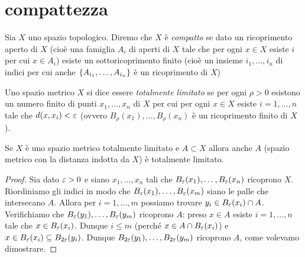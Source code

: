 \section{compattezza}



\begin{definition}[compattezza]
Sia $X$ uno spazio topologico. 
Diremo che $X$ è \emph{compatto} se dato un ricoprimento 
aperto di $X$ (cioè una famiglia $A_i$ di aperti di $X$ tale
che per ogni $x\in X$ esiste $i$ per cui $x\in A_i$)
esiste un sottoricoprimento finito 
(cioè un insieme $i_1,\dots,i_n$
di indici per cui anche ${\left\{ A_{i_1}, \dots, A_{i_n} \right\}}$ 
è un ricoprimento di $X$)
\end{definition}

\begin{definition}
Uno spazio metrico $X$ si dice essere \emph{totalmente limitato}
se per ogni $\rho>0$ esistono un numero finito di punti 
$x_1, \dots, x_n$ di $X$ per cui per ogni $x\in X$ 
esiste $i=1,\dots,n$ tale che $d(x,x_i)<\varepsilon$
(ovvero $B_\rho(x_1), \dots, B_\rho(x_n)$ 
è un ricoprimento finito di $X$).
\end{definition}

\begin{lemma}
Se $X$ è uno spazio metrico totalmente limitato e $A\subset X$ allora 
anche $A$ (spazio metrico con la distanza indotta da $X$) 
è totalmente limitato.
\end{lemma}
\begin{proof}
Sia dato $\varepsilon>0$ e siano $x_1, \dots, x_n$ tali che 
$B_\varepsilon(x_1), \dots, B_\varepsilon(x_n)$ ricoprono $X$.
Riordiniamo gli indici in modo che $B_\varepsilon(x_1), \dots, B_\varepsilon(x_m)$
siano le palle che intersecano $A$.
Allora per $i=1,\dots,m$ possiamo trovare $y_i\in B_\varepsilon(x_i)\cap A$.
Verifichiamo che $B_\varepsilon(y_1), \dots, B_\varepsilon(y_m)$ ricoprono $A$:
preso $x\in A$ esiste $i=1,\dots,n$ tale che $x\in B_\varepsilon(x_i)$.
Dunque $i\le m$ (perché $x\in A\cap B_\varepsilon(x_i)$) e 
$x \in B_\varepsilon(x_i) \subseteq B_{2\varepsilon}(y_i)$.
Dunque $B_{2\varepsilon}(y_1), \dots, B_{2\varepsilon}(y_m)$ ricoprono $A$,
come volevamo dimostrare.
\end{proof}

